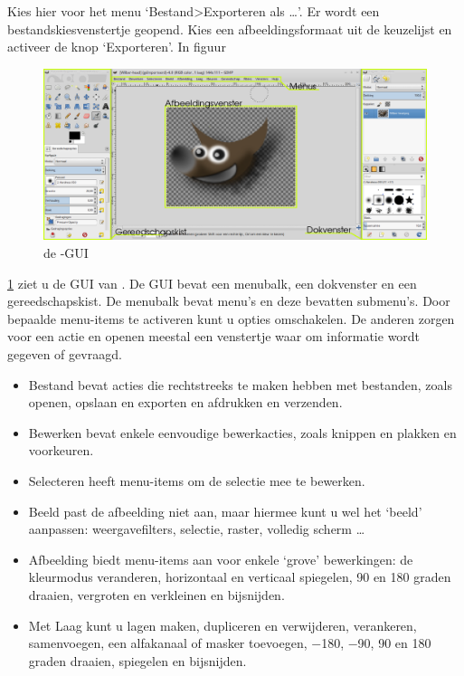 \documentclass[11pt,a5paper,twoside]{book}
\begin{document}
   Kies hier voor het menu ‘Bestand>Exporteren als \ldots{}’. Er wordt een
    bestandskiesvenstertje geopend. Kies een afbeeldingsformaat uit de keuzelijst
    en activeer de knop ‘Exporteren’.
 In figuur \begin{figure}%
   \includegraphics[width=0.90\linewidth]{GIMP-overview.png}%
   \caption{de \GIMP{}-GUI}\label{gx:overview}%
  \end{figure} \ref{gx:overview} ziet u
  de GUI van \GIMP{}. De GUI bevat een menubalk, een dokvenster en een
  gereedschapskist.
  De menubalk bevat menu’s en deze bevatten submenu’s. Door bepaalde menu-items
   te activeren kunt u opties omschakelen. De anderen zorgen voor een actie en
   openen meestal een venstertje waar om informatie wordt gegeven of gevraagd.
  \begin{itemize}
   \item Bestand bevat acties die rechtstreeks te maken hebben met bestanden,
    zoals openen, opslaan en exporten en afdrukken en verzenden.
   \item Bewerken bevat enkele eenvoudige bewerkacties, zoals knippen en
    plakken en voorkeuren.
   \item Selecteren heeft menu-items om de selectie mee te bewerken.
   \item Beeld past de afbeelding niet aan, maar hiermee kunt u wel het ‘beeld’
    aanpassen: weergavefilters, selectie, raster, volledig scherm \ldots{}
   \item Afbeelding biedt menu-items aan voor enkele ‘grove’ bewerkingen:
    de kleurmodus veranderen, horizontaal en verticaal spiegelen, 90 en 180
    graden draaien, vergroten en verkleinen en bijsnijden.
   \item Met Laag kunt u lagen maken, dupliceren
    en verwijderen, verankeren, samenvoegen, een alfakanaal of masker toevoegen,
    −180, −90, 90 en 180 graden draaien,
    spiegelen en bijsnijden.
  \end{itemize}
\end{document}
